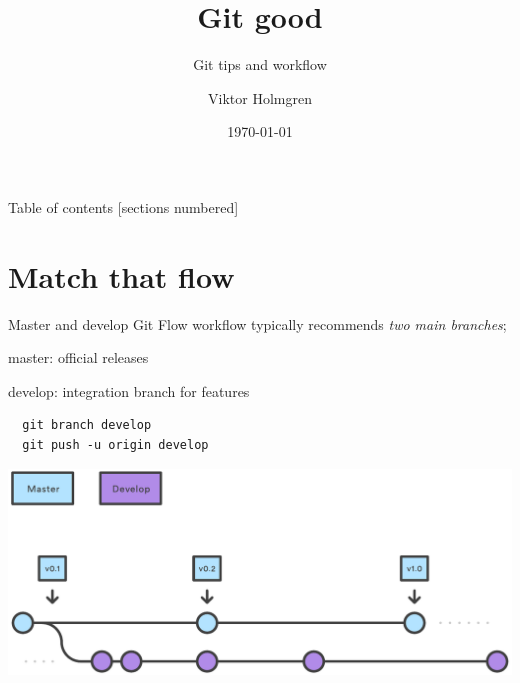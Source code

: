 \documentclass[10pt]{beamer}
\title{Git good}
\subtitle{Git tips and workflow}
\date{\today}
\author{Viktor Holmgren}
\institute{LiTHe kod}
\begin{document}
\maketitle

\begin{frame}{Table of contents}
  [sections numbered]
  \tableofcontents[hideallsubsections]
\end{frame}

\section{Match that flow}

\begin{frame}[fragile]{Master and develop}
  Git Flow workflow typically recommends \emph{two main branches};
  \begin{description}
    \item master: official releases
    \item develop: integration branch for features
  \end{description}

  \begin{lstlisting}
  git branch develop
  git push -u origin develop
  \end{lstlisting}

  \includegraphics[width=\textwidth]{developbranch}

\end{frame}
\end{document}
